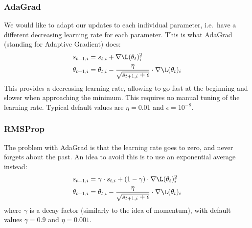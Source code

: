 \subsubsection{AdaGrad}
We would like to adapt our updates to each individual parameter, i.e.~have a different decreasing learning rate for each parameter. This is what AdaGrad (standing for Adaptive Gradient) does:
\begin{equation*}
    \begin{aligned}
        s_{t+1,i} &= s_{t,i} + \nabla\L(\theta_t)_i^2\\
        \theta_{t+1,i} &= \theta_{t,i} - \frac{\eta}{\sqrt{s_{t+1,i}+\epsilon}}\cdot\nabla\L(\theta_t)_i
    \end{aligned}
\end{equation*}
This provides a decreasing learning rate, allowing to go fast at the beginning and slower when approaching the minimum. This requires no manual tuning of the learning rate. Typical default values are $\eta=0.01$ and $\epsilon=10^{-8}$.

\subsubsection{RMSProp}
The problem with AdaGrad is that the learning rate goes to zero, and never forgets about the past. An idea to avoid this is to use an exponential average instead:
\begin{equation*}
    \begin{aligned}
        s_{t+1,i} &= \gamma\cdot s_{t,i} + (1-\gamma)\cdot\nabla\L(\theta_t)_i^2\\
        \theta_{t+1,i} &= \theta_{t,i} - \frac{\eta}{\sqrt{s_{t+1,i}+\epsilon}}\cdot\nabla\L(\theta_t)_i
    \end{aligned}
\end{equation*}
where $\gamma$ is a decay factor (similarly to the idea of momentum), with default values $\gamma=0.9$ and $\eta=0.001$.

